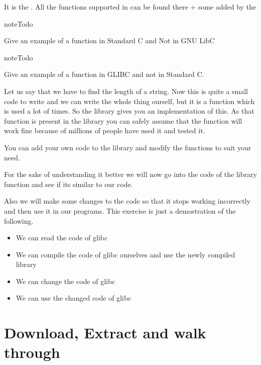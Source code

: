 \documentclass[letterpaper,10pt,english]{sphinxmanual}
\begin{document}
It is the . All the functions
supported in  can be found there + some added by the

\begin{sphinxadmonition}{note}{Todo}

Give an example of a function in Standard C and Not in GNU LibC
\end{sphinxadmonition}

\begin{sphinxadmonition}{note}{Todo}

Give an example of a function in GLIBC and not in Standard C.
\end{sphinxadmonition}

 Let us say that we have to find the length of a string. Now this
is quite a small code to write and we can write the whole thing ourself, but it
is a function which is used a lot of times. So the library gives you an
implementation of this. As that function is present in the library you can
safely assume that the function will work fine because of millions of people
have used it and tested it.

You can add your own code to the library and modify the functions to suit your need.

For the sake of understanding it better we will now go into the code of the
library function and see if its similar to our code.

Also we will make some changes to the code so that it stops working incorrectly
and then use it in our programs. This exercise is just a demostration of the
following.
\begin{itemize}
\item {} 
We can read the code of glibc

\item {} 
We can compile the code of glibc ourselves and use the newly compiled library

\item {} 
We can change the code of glibc

\item {} 
We can use the changed code of glibc

\end{itemize}


\section{Download, Extract and walk through }
\label{\detokenize{03_glibc:download-extract-and-walk-through-glibc}}
\end{document}
